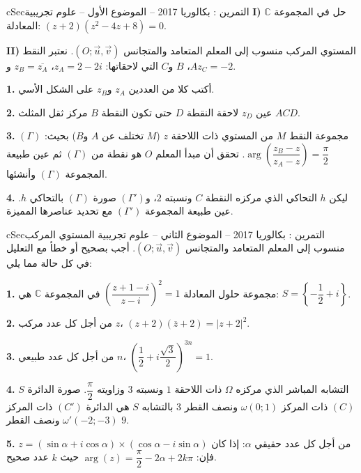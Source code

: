 \documentclass[12pt,a4paper]{article}
\newenvironment{BOX}[2]{\begin{otherlanguage}{english}\begin{arbox}{#1}{#2}}{\end{arbox}\end{otherlanguage}}
\newcounter{exo}
\newenvironment{tamrin}[1]{\stepcounter{exo}\begin{BOX}{cSec}{التمرين \theexo: #1}}{\end{BOX}}
\newcommand{\QQ}[1]{\par\smallskip\textbf{#1.} }
\begin{document}
\begin{tamrin}{بكالوريا 2017 -- الموضوع الأول -- علوم تجريبية}
\textbf{I)} حل في المجموعة $\mathbb{C}$ المعادلة: $(z+2)\left(z^2-4z+8\right)=0$.

\textbf{II)} المستوي المركب منسوب إلى المعلم المتعامد والمتجانس $(O;\vec u,\vec v)$.
نعتبر النقط $A$، $B$ و$C$ التي لاحقاتها: $z_A=2-2i$، $z_B=\overline{z_A}$ و$z_C=-2$.
\QQ{1} أكتب كلا من العددين $z_A$ و$z_B$ على الشكل الأسي.
\QQ{2} عين $z_D$ لاحقة النقطة $D$ حتى تكون النقطة $B$ مركز ثقل المثلث $ACD$.
\QQ{3} $(\Gamma)$ مجموعة النقط $M$ من المستوي ذات اللاحقة $z$ ($M$ تختلف عن $A$ و$B$) بحيث: $\arg\left(\dfrac{z_B-z}{z_A-z}\right)=\dfrac{\pi}{2}$.
تحقق أن مبدأ المعلم $O$ هو نقطة من $(\Gamma)$ ثم عين طبيعة المجموعة $(\Gamma)$ وأنشئها.
\QQ{4} ليكن $h$ التحاكي الذي مركزه النقطة $C$ ونسبته $2$، و$(\Gamma')$ صورة $(\Gamma)$ بالتحاكي $h$.
عين طبيعة المجموعة $(\Gamma')$ مع تحديد عناصرها المميزة.
\end{tamrin}

\begin{tamrin}{بكالوريا 2017 -- الموضوع الثاني -- علوم تجريبية}
المستوي المركب منسوب إلى المعلم المتعامد والمتجانس $(O;\vec u,\vec v)$.
أجب بصحيح أو خطأ مع التعليل في كل حالة مما يلي:
\QQ{1} مجموعة حلول المعادلة $\left(\dfrac{z+1-i}{z-i}\right)^2=1$ في المجموعة $\mathbb{C}$ هي: $S=\left\{-\dfrac12+i\right\}$.
\QQ{2} من أجل كل عدد مركب $z$، $(z+2)\left(\overline{z}+2\right)=|z+2|^2$.
\QQ{3} من أجل كل عدد طبيعي $n$، $\left(\dfrac12+i\dfrac{\sqrt3}{2}\right)^{3n}=1$.
\QQ{4} $S$ التشابه المباشر الذي مركزه $\Omega$ ذات اللاحقة $1$ ونسبته $3$ وزاويته $\dfrac{\pi}{2}$.
صورة الدائرة $(C)$ ذات المركز $\omega(0;1)$ ونصف القطر $3$ بالتشابه $S$ هي الدائرة $(C')$ ذات المركز $\omega'(-2;-3)$ ونصف القطر $9$.
\QQ{5} من أجل كل عدد حقيقي $\alpha$: إذا كان $z=(\sin\alpha+i\cos\alpha)\times(\cos\alpha-i\sin\alpha)$ فإن: $\arg(z)=\dfrac{\pi}{2}-2\alpha+2k\pi$ حيث $k$ عدد صحيح.
\end{tamrin}
\end{document}
